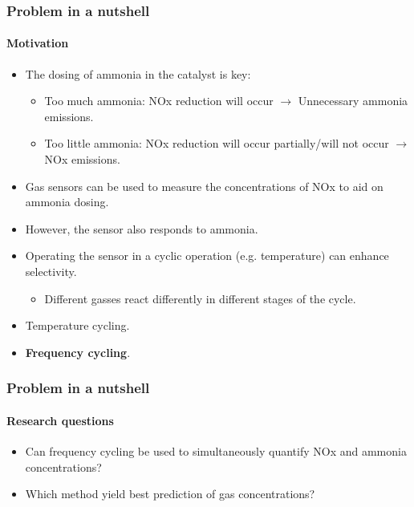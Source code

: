 \documentclass{beamer}
\begin{document}
\begin{frame}
	\frametitle{Problem in a nutshell}
	\framesubtitle{Motivation}
	
	\begin{itemize}
		\item The dosing of ammonia in the catalyst is key:
		\begin{itemize}
			\item Too much ammonia: NOx reduction will occur $\rightarrow$ Unnecessary ammonia emissions.
			\item Too little ammonia: NOx reduction will occur partially/will not occur $\rightarrow$ NOx emissions.
		\end{itemize}
		\item Gas sensors can be used to measure the concentrations of NOx to aid on ammonia dosing.
		\item However, the sensor also responds to ammonia.
		\item Operating the sensor in a cyclic operation (e.g. temperature) can enhance selectivity.
		\begin{itemize}
			\item Different gasses react differently in different stages of the cycle.
		\end{itemize}
		\item Temperature cycling.
		\item \textbf{Frequency cycling}.
	\end{itemize}
	
\end{frame}


\begin{frame}
	\frametitle{Problem in a nutshell}
	\framesubtitle{Research questions}
	
	\begin{itemize}
		\item Can frequency cycling be used to simultaneously quantify NOx and ammonia concentrations?
		\item Which method yield best prediction of gas concentrations?
	\end{itemize}
	
\end{frame}
\end{document}
